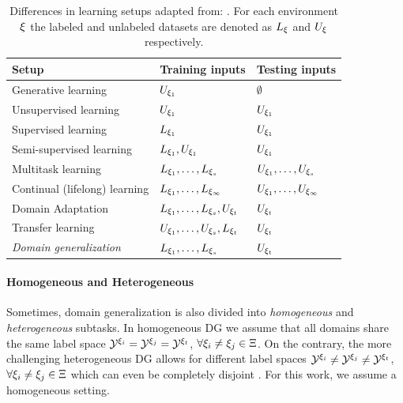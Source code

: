 \begin{table}[t]
    \centering
    \begin{tabular}{lll}
    \toprule
    \textbf{Setup} & \textbf{Training inputs}  & \textbf{Testing inputs} \\
    \midrule
        Generative learning & $U_{\xi_1}$ & $\emptyset$ \\ 
        Unsupervised learning & $U_{\xi_1}$ & $U_{\xi_1}$  \\ 
        Supervised learning & $L_{\xi_1}$ & $U_{\xi_1}$ \\ 
        Semi-supervised learning & $L_{\xi_1}, U_{\xi_1}$ & $U_{\xi_1}$ \\ 
        Multitask learning & $L_{\xi_1}, \ldots, L_{\xi_s}$ & $U_{\xi_1}, \ldots, U_{\xi_s}$ \\ 
        Continual (lifelong) learning & $L_{\xi_1}, \ldots, L_{\xi_\infty}$ & $U_{\xi_1}, \ldots, U_{\xi_\infty}$ \\ 
        Domain Adaptation & $L_{\xi_1}, \ldots, L_{\xi_s}, U_{\xi_t}$ & $U_{\xi_t}$ \\ 
        Transfer learning & $U_{\xi_1}, \ldots, U_{\xi_s}, L_{\xi_t}$ & $U_{\xi_t}$ \\ 
        \emph{Domain generalization} & $L_{\xi_1}, \ldots, L_{\xi_s}$ & $U_{\xi_t}$ \\ 
    \bottomrule
    \end{tabular}
    \caption[Differences in learning setups]{Differences in learning setups adapted from: \citep{gulrajani2020search}. For each environment $\xi$ the labeled and unlabeled datasets are denoted as $L_\xi$ and $U_\xi$ respectively.}
    \label{tab:learning_setups}
\end{table}

\paragraph{Homogeneous and Heterogeneous}
Sometimes, domain generalization is also divided into \emph{homogeneous} and \emph{heterogeneous} subtasks. In homogeneous DG we assume that all domains share the same label space $\mathcal{Y}^{\xi_i} = \mathcal{Y}^{\xi_j} = \mathcal{Y}^{\xi_t}$, $\forall \xi_i \neq \xi_j \in \Xi$. On the contrary, the more challenging heterogeneous DG allows for different label spaces $\mathcal{Y}^{\xi_i} \neq \mathcal{Y}^{\xi_j} \neq \mathcal{Y}^{\xi_t}$, $\forall \xi_i \neq \xi_j \in \Xi$ which can even be completely disjoint \citep{LiZYLSH19}. For this work, we assume a homogeneous setting.

